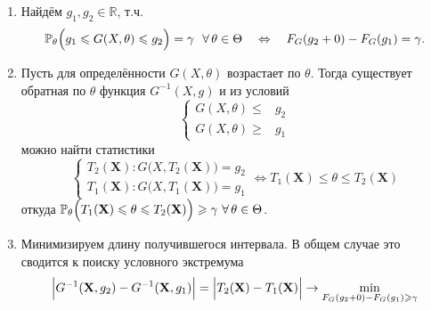 \begin{enumerate}
    \item Найдём $g_{1}, g_{2} \in \mathbb{R}$, т.ч.
        \begin{equation*}
            \mathbb{P}_{\theta}\Bigl(g_{1} \leqslant G(X, \theta) \leqslant g_{2}\Bigr)=\gamma~~\forall \, \theta \in \Theta \quad \Leftrightarrow \quad  F_{G}(g_{2} + 0) - F_{G}(g_{1})=\gamma.
        \end{equation*}
    \item Пусть для определённости $G(X,\theta)$ возрастает по $\theta$. 
        Тогда существует обратная по $\theta$ функция $G^{-1}(X, g)$ и из условий
        \begin{equation*}
            \begin{cases}
                G(X, \theta) \leqslant & g_{2} \\
                G(X, \theta) \geqslant & g_{1}
            \end{cases}
        \end{equation*}
        можно найти статистики
        \begin{equation*}
            \begin{cases}
                T_{2}(\mathbf{X})\colon G\bigl(X, T_{2}(\mathbf{X})\bigr) = g_{2} \\ 
                T_{1}(\mathbf{X})\colon G\bigl(X, T_{1}(\mathbf{X})\bigr) = g_{1}
            \end{cases}
            \Leftrightarrow T_{1}(\mathbf{X}) \leqslant \theta \leqslant T_{2}(\mathbf{X}) 
        \end{equation*}
        откуда $\mathbb{P}_{\theta}\Bigl(T_{1}(\mathbf{X}) \leqslant \theta \leqslant T_{2}(\mathbf{X})\Bigr) \geqslant \gamma~ \forall \, \theta \in \Theta$.
    \item 
        Минимизируем длину получившегося интервала.
        В общем случае это сводится к поиску условного экстремума
        \begin{equation*}
            \Bigl| G^{-1}(\mathbf{X}, g_2) - G^{-1}(\mathbf{X}, g_1) \Bigr| = 
            \Bigl| T_2(\mathbf{X}) - T_1(\mathbf{X}) \Bigr| \rightarrow 
            \min_{F_{G}(g_2 + 0) - F_{G}(g_1) \geqslant \gamma}
        \end{equation*}
\end{enumerate}

